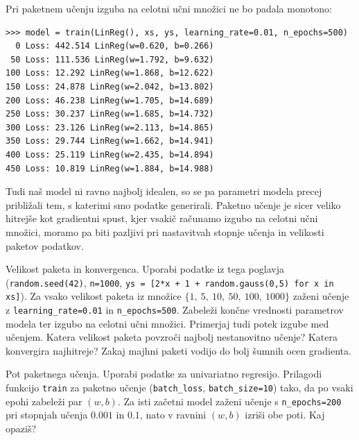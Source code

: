 Pri paketnem učenju izguba na celotni učni množici ne bo padala monotono:
\vspace*{3mm}
\begin{lstlisting}
>>> model = train(LinReg(), xs, ys, learning_rate=0.01, n_epochs=500)
  0 Loss: 442.514 LinReg(w=0.620, b=0.266)
 50 Loss: 111.536 LinReg(w=1.792, b=9.632)
100 Loss: 12.292 LinReg(w=1.868, b=12.622)
150 Loss: 24.878 LinReg(w=2.042, b=13.802)
200 Loss: 46.238 LinReg(w=1.705, b=14.689)
250 Loss: 30.237 LinReg(w=1.685, b=14.732)
300 Loss: 23.126 LinReg(w=2.113, b=14.865)
350 Loss: 29.744 LinReg(w=1.662, b=14.941)
400 Loss: 25.119 LinReg(w=2.435, b=14.894)
450 Loss: 10.819 LinReg(w=1.884, b=14.988)
\end{lstlisting}
%
Tudi naš model ni ravno najbolj idealen, so se pa parametri modela precej približali tem, s katerimi smo podatke generirali. Paketno učenje je sicer veliko hitrejše kot gradientni spust, kjer vsakič računamo izgubo na celotni učni množici, moramo pa biti pazljivi pri nastavitvah stopnje učenja in velikosti paketov podatkov.

\begin{exercise}{Velikost paketa in konvergenca.}
    Uporabi podatke iz tega poglavja
    (\texttt{random.seed(42)}, \texttt{n=1000},
    \texttt{ys = [2*x + 1 + random.gauss(0,5) for x in xs]}).
    Za vsako velikost paketa iz množice
    $\{1,\ 5,\ 10,\ 50,\ 100,\ 1000\}$
    zaženi učenje z
    \texttt{learning\_rate=0.01}
    in \texttt{n\_epochs=500}.
    Zabeleži končne vrednosti parametrov modela ter izgubo na celotni učni množici.
    Primerjaj tudi potek izgube med učenjem.
    Katera velikost paketa povzroči najbolj nestanovitno učenje?
    Katera konvergira najhitreje?
    Zakaj majhni paketi vodijo do bolj šumnih ocen gradienta.
\end{exercise}

\begin{exercise}{Pot paketnega učenja.}
Uporabi podatke za univariatno regresijo. Prilagodi funkcijo \texttt{train} za paketno učenje (\texttt{batch\_loss}, \texttt{batch\_size=10}) tako, da po vsaki epohi zabeleži par $(w, b)$. Za isti začetni model zaženi učenje s \texttt{n\_epochs=200} pri stopnjah učenja $0.001$ in $0.1$, nato v ravnini $(w, b)$ izriši obe poti. Kaj opaziš?
\end{exercise}

